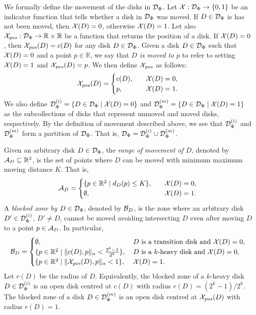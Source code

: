 \begin{toappendix}
\begin{toappendix}
We formally define the movement of the disks in $\mathcal{D}_\Phi$. 
Let $\mathcal{X} : \mathcal{D}_\Phi \to \{0,1\}$ be an indicator function that tells whether a disk in $\mathcal{D}_\Phi$ was moved. If $D \in \mathcal{D}_\Phi$ is has not been moved, then $\mathcal{X}(D) = 0$, otherwise $\mathcal{X}(D) = 1$. 
Let also $\mathcal{X}_{\mathit{pos}}: \mathcal{D}_\Phi \to \mathbb{R}\times \mathbb{R}$ be a function that returns the position of a disk.
If $\mathcal{X}(D) = 0$, then $\mathcal{X}_{\mathit{pos}}(D) = c(D)$ for any disk $D \in \mathcal{D}_\Phi$.
Given a disk $D \in \mathcal{D}_\Phi$ such that $\mathcal{X}(D) = 0$ and a point $p \in \mathbb{R}$, we say that \emph{$D$ is moved to $p$} to refer to setting $\mathcal{X}(D) = 1$ and $\mathcal{X}_{\mathit{pos}}(D) = p$.
We then define $\mathcal{X}_{\mathit{pos}}$ as follows:
\[
    \mathcal{X}_{\mathit{pos}}(D) = \begin{cases}
        c(D),&\quad \mathcal{X}(D) = 0,\\
        p, &\quad \mathcal{X}(D) = 1.
    \end{cases}
\]
We also define $\mathcal{D}^{(i)}_\Phi = \{D \in \mathcal{D}_\Phi\mid \mathcal{X}(D) = 0\}$ and $\mathcal{D}^{(m)}_\Phi = \{D \in \mathcal{D}_\Phi\mid \mathcal{X}(D) = 1\}$ as the subcollections of disks that represent unmoved and moved disks, respectively.
By the definition of movement described above, we see that $\mathcal{D}^{(i)}_\Phi$ and $\mathcal{D}^{(m)}_\Phi$ form a partition of $\mathcal{D}_\Phi$. That is, $\mathcal{D}_\Phi = \mathcal{D}^{(i)}_\Phi \cup \mathcal{D}^{(m)}_\Phi$.

Given an arbitrary disk $D \in \mathcal{D}_\Phi$, the \emph{range of movement of $D$}, denoted by $\mathcal{A}_D \subseteq \mathbb{R}^2$, is the set of points where $D$ can be moved with minimum maximum moving distance $K$. That is, 
\[
\mathcal{A}_D = \begin{cases}
        \{p \in \mathbb{R}^2\mid d_D(p) \le K\}, & \quad \mathcal{X}(D) = 0,\\
        \emptyset, & \quad \mathcal{X}(D) = 1.
    \end{cases}
\]
A \emph{blocked zone by} $D \in \mathcal{D}_\Phi$, denoted by $\mathcal{B}_D$, is the zone where an arbitrary disk $D'\in \mathcal{D}^{(i)}_\Phi$, $D'\neq D$, cannot be moved avoiding intersecting $D$ even after moving $D$ to a point $p\in \mathcal{A}_D$. In particular,
\[
    \mathcal{B}_D  = \begin{cases}
        \emptyset,&\: \text{$D$ is a transition disk and $\mathcal{X}(D) = 0$} ,\\
        \{p \in \mathbb{R}^2\mid \lVert c(D),p\rVert_\alpha < \frac{2^{k}-1}{2^k}\},&\: \text{$D$ is a $k$-heavy disk and $\mathcal{X}(D) = 0$},\\
        \{p \in \mathbb{R}^2\mid \lVert \mathcal{X}_{\mathit{pos}}(D),p\rVert_\alpha  < 1\},&\: \mathcal{X}(D) = 1.\\
    \end{cases}
\]
Let $r(D)$ be the radius of $D$.
Equivalently, the blocked zone of a $k$-heavy disk $D \in \mathcal{D}^{(i)}_\Phi$ is an open disk centred at $c(D)$ with radius $r(D) =(2^{k}-1)/2^k$.
The blocked zone of a disk $D \in \mathcal{D}^{(m)}_\Phi$ is an open disk centred at $\mathcal{X}_{\mathit{pos}}(D)$ with radius $r(D) = 1$.


\end{toappendix}
\end{toappendix}
